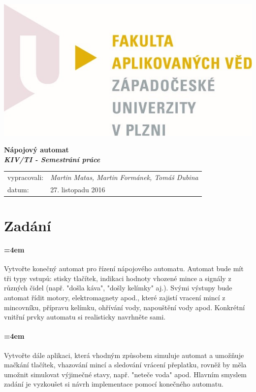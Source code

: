 \documentclass[12pt,a4paper]{article}
\begin{document}
%
%
\begin{titlepage}
	\includegraphics[left]{images/logo_fav}\par
	\vspace{5cm}
	{
		\centering
		\Huge{\textbf{Nápojový automat}}\\
		\Huge{\textbf{\textit{KIV/TI - Semestrání práce}}}\\
	}	
	\vfill
    \begin{tabular}{ll}
		vypracovali: & \it{Martin Matas, Martin Formánek, Tomáš Dubina} \\
		datum: & {\large 27. listopadu 2016\par}
	\end{tabular}
\end{titlepage}
%
%
\tableofcontents
\newpage
%
%
\section{Zadání}

\paragraph{\parindent=4em}{
	Vytvořte konečný automat pro řízení nápojového automatu. Automat bude mít tři typy vstupů: stisky tlačítek, indikaci hodnoty vhozené mince a signály z různých čidel (např. "došla káva", "došly kelímky" aj.). Svými výstupy bude automat řídit motory, elektromagnety apod., které zajistí vracení mincí z mincovníku, přípravu kelímku, ohřívání vody, napouštění vody apod. Konkrétní vnitřní prvky automatu si realisticky navrhněte sami.
}

\paragraph{\parindent=4em}{	
	Vytvořte dále aplikaci, která vhodným způsobem simuluje automat a umožňuje mačkání tlačítek, vhazování mincí a sledování vrácení přeplatku, rovněž by měla umožnit simulovat výjimečné stavy, např. "neteče voda" apod.
Hlavním smyslem zadání je vyzkoušet si návrh implementace pomocí konečného automatu.
}
\end{document}
